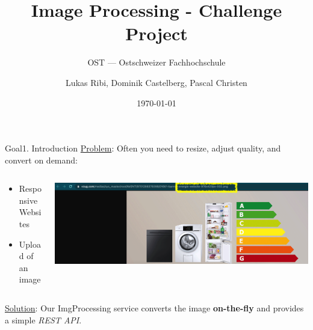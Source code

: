 \documentclass[aspectratio=169,20pt]{beamer}
\title{Image Processing - Challenge Project}
\subtitle{OST — Ostschweizer Fachhochschule}
\date{\today}
\author{Lukas Ribi, Dominik Castelberg, Pascal Christen}
\institute{DS1 - Thomas Bocek }
\begin{document}
\begin{frame}
	\titlepage
\end{frame}

\begin{frame}{Goal}{1. Introduction}
	\underline{Problem}: Often you need to resize, adjust quality, and convert on demand:
	\vspace{1in}
	\begin{columns}[onlytextwidth,T]
		\begin{column}{.25\linewidth}
			\begin{itemize}
				\item{Responsive Websites}
				\item{Upload of an image}
			\end{itemize}
		\end{column}
		\begin{column}{.65\linewidth}
			\includegraphics[scale=0.55]{vzug}
		\end{column}
	\end{columns}
	\underline{Solution}: Our ImgProcessing service converts the image \textbf{on-the-fly} and provides a simple \textit{REST API}.
\end{frame}
\end{document}
